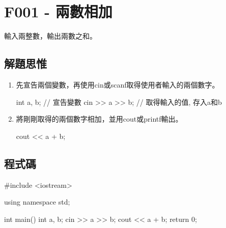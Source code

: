 \section{F001 - 兩數相加}
輸入兩整數，輸出兩數之和。
\subsection{解題思惟}
\begin{enumerate}
\item 先宣告兩個變數，再使用cin或scanf取得使用者輸入的兩個數字。
\begin{inside}
	int a, b; // 宣告變數
	cin >> a >> b; // 取得輸入的值, 存入a和b
\end{inside}
\item 將剛剛取得的兩個數字相加，並用cout或printf輸出。
\begin{inside}
	cout << a + b;
\end{inside}
\end{enumerate}

\subsection{程式碼}
\begin{cppcode}
#include <iostream>

using namespace std;

int main()
{
	int a, b;
	cin >> a >> b;
	cout << a + b;
	return 0;
}
\end{cppcode}
